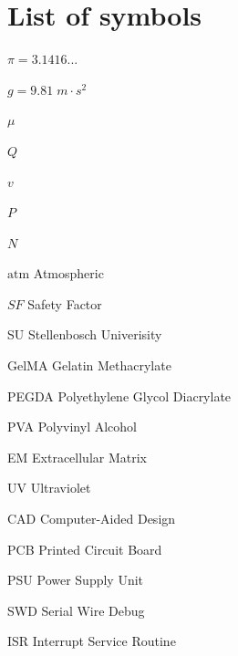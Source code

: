 \chapter{List of symbols}

\begin{Nomencl}[1cm]
    \item[$\pi = 3.1416...$]
    \item[$g = 9.81\; m\cdot s^2$]
    
    \item[$\mu$]       
    \item[$Q$]         
    \item[$v$]         
    \item[$P$]         
    \item[$N$]         
    
    \item[$\mathrm{atm}$] Atmospheric
    \item[$SF$]          Safety Factor

\end{Nomencl}

\begin{Nomencl}[1cm]
    \item[SU] Stellenbosch Univerisity
    \item[GelMA] Gelatin Methacrylate
    \item[PEGDA] Polyethylene Glycol Diacrylate
    \item[PVA] Polyvinyl Alcohol
    \item[EM] Extracellular Matrix
    \item[UV] Ultraviolet
    \item[CAD] Computer-Aided Design    
    \item[PCB] Printed Circuit Board
    \item[PSU] Power Supply Unit
    \item[SWD] Serial Wire Debug
    \item[ISR] Interrupt Service Routine
\end{Nomencl}
